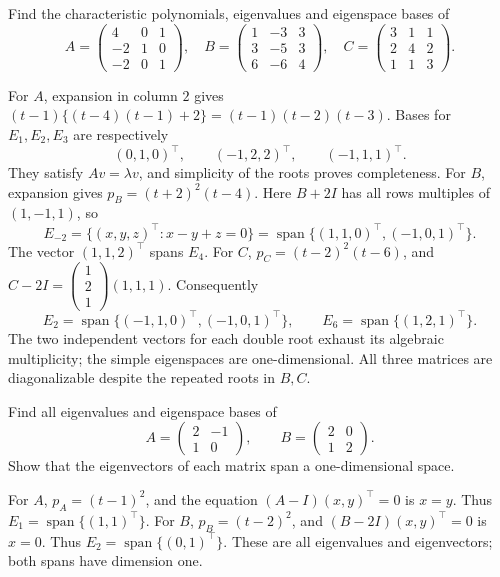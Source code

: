 \begin{problem}\label{ex:08:lang-three}
Find the characteristic polynomials, eigenvalues and eigenspace bases of
\[
 A=\begin{pmatrix}4&0&1\\-2&1&0\\-2&0&1\end{pmatrix},\quad
 B=\begin{pmatrix}1&-3&3\\3&-5&3\\6&-6&4\end{pmatrix},\quad
 C=\begin{pmatrix}3&1&1\\2&4&2\\1&1&3\end{pmatrix}.
\]
\end{problem}
\begin{solution}
For \(A\), expansion in column \(2\) gives
\((t-1)\{(t-4)(t-1)+2\}=(t-1)(t-2)(t-3)\).
Bases for \(E_1,E_2,E_3\) are respectively
\[
 (0,1,0)^\top,\qquad(-1,2,2)^\top,\qquad(-1,1,1)^\top.
\]
They satisfy \(Av=\lambda v\), and simplicity of the roots proves
completeness.
For \(B\), expansion gives \(p_B=(t+2)^2(t-4)\).
Here \(B+2I\) has all rows multiples of \((1,-1,1)\), so
\[
 E_{-2}=\{(x,y,z)^\top:x-y+z=0\}
 =\operatorname{span}\{(1,1,0)^\top,(-1,0,1)^\top\}.
\]
The vector \((1,1,2)^\top\) spans \(E_4\).
For \(C\), \(p_C=(t-2)^2(t-6)\), and
\(C-2I=\begin{pmatrix}1\\2\\1\end{pmatrix}(1,1,1)\).
Consequently
\[
 E_2=\operatorname{span}\{(-1,1,0)^\top,(-1,0,1)^\top\},\qquad
 E_6=\operatorname{span}\{(1,2,1)^\top\}.
\]
The two independent vectors for each double root exhaust its algebraic
multiplicity; the simple eigenspaces are one-dimensional. All three
matrices are diagonalizable despite the repeated roots in \(B,C\).
\end{solution}

\begin{problem}\label{ex:08:lang-repeated}
Find all eigenvalues and eigenspace bases of
\[
 A=\begin{pmatrix}2&-1\\1&0\end{pmatrix},\qquad
 B=\begin{pmatrix}2&0\\1&2\end{pmatrix}.
\]
Show that the eigenvectors of each matrix span a one-dimensional space.
\end{problem}
\begin{solution}
For \(A\), \(p_A=(t-1)^2\), and the equation
\((A-I)(x,y)^\top=0\) is \(x=y\).
Thus \(E_1=\operatorname{span}\{(1,1)^\top\}\).
For \(B\), \(p_B=(t-2)^2\), and
\((B-2I)(x,y)^\top=0\) is \(x=0\).
Thus \(E_2=\operatorname{span}\{(0,1)^\top\}\).
These are all eigenvalues and eigenvectors; both spans have dimension one.
\end{solution}

